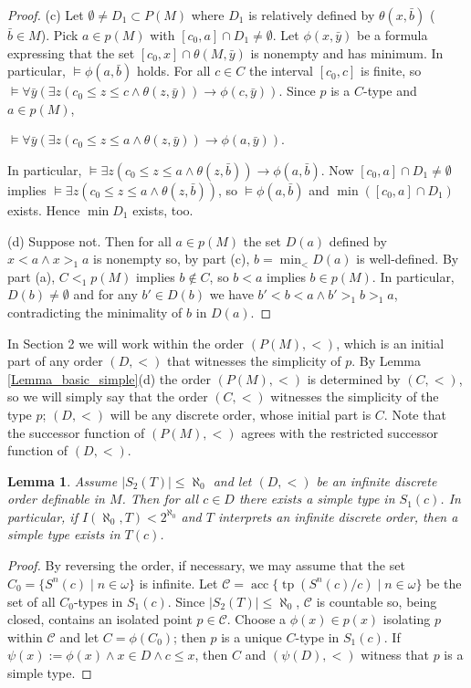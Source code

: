 \documentclass[12pt]{amsart}
\newtheorem{Lemma}[Theorem]{Lemma}
\theoremstyle{definition}
\DeclareMathOperator{\tp}{tp}
\DeclareMathOperator{\acc}{acc}
\begin{document}
\begin{proof}
\smallskip
(c) Let $\emptyset\neq D_1\subset P(M)$  where $D_1$ is relatively defined by $\theta(x,\bar b)$ ($\bar b\in M$). Pick $a\in p(M)$ with $[c_0,a]\cap D_1\neq\emptyset$.  Let $\phi(x,\bar y)$ be a formula expressing that the set
$[c_0,x]\cap\theta(M,\bar y)$ is nonempty and has minimum. 
In particular, $\models\phi(a,\bar b)$ holds. For all $c\in C$ the interval $[c_0,c]$ is finite, so $\models \forall \bar y \left(\exists z(c_0\leq z\leq c\land \theta(z,\bar y))\rightarrow \phi(c,\bar y)\right)$. Since $p$ is a $C$-type and $a\in p(M)$, 
\begin{center} 
$\models \forall \bar y \left(\exists z(c_0\leq z\leq a\land \theta(z,\bar y))\rightarrow \phi(a,\bar y)\right)$.  
\end{center}
In particular,   $\models  \exists z(c_0\leq z\leq a\land \theta(z,\bar b))\rightarrow \phi(a,\bar b)$.  Now  $[c_0,a]\cap D_1\neq \emptyset$ implies $\models  \exists z(c_0\leq z\leq a\land \theta(z,\bar b))$, so $\models\phi(a,\bar b)$ and $\min ([c_0,a]\cap D_1)$ exists. Hence $\min D_1$ exists, too.

\smallskip
(d) Suppose not. Then for all $a\in p(M)$ the set $D(a)$ defined by $x<a\land x>_1 a$ is nonempty so, by part (c), $b=\min_{<} D(a)$ is well-defined. By part (a), $C<_1p(M)$ implies $b\notin C$, so  $b<a$ implies $b\in p(M)$. In particular, $D(b)\neq\emptyset$ and for any $b'\in D(b)$ we have $b'<b<a\land b'>_1b>_1 a$, contradicting the minimality of $b$ in $D(a)$. 
\end{proof}

In Section 2 we will work  within the order $(P(M),<)$, which is an initial part of any  order $(D,<)$ that witnesses the simplicity of $p$. By Lemma \ref{Lemma_basic_simple}(d) the order $(P(M),<)$ is determined by   $(C,<)$, so we will simply say that the order $(C,<)$ witnesses the simplicity of the type $p$; $(D,<)$ will be any discrete order, whose initial part is $C$. Note that the  successor function  of $(P(M),<)$ agrees  with the restricted  successor function of $(D,<)$. 


\begin{Lemma}\label{Lemma_simpleExist}
Assume $|S_2(T)|\leq\aleph_0$ and  let $(D,<)$ be an infinite discrete order definable in $M$. Then for all $c\in D$ there exists a simple type in $S_1(c)$.
In particular, if $I(\aleph_0,T)<2^{\aleph_0}$ and $T$ interprets an infinite  discrete order, then a simple type exists in $T(c)$.
\end{Lemma}
\begin{proof}
By reversing the order, if necessary, we may assume that the set $C_0=\{S^n(c)\mid n\in \omega\}$ is infinite.  Let $\mathcal C=\acc \{\tp(S^n(c)/c)\mid n\in\omega \}$
be the set of all $C_0$-types in $S_1(c)$. Since $|S_2(T)|\leq\aleph_0$, $\mathcal C$ is  countable so, being closed, contains an  isolated point $p\in \mathcal C$. Choose a  
$\phi(x)\in p(x)$ isolating  $p$ within $\mathcal C$ and let $C=\phi(C_0)$; then $p$ is a unique $C$-type in $S_1(c)$.   If $\psi(x):=\phi(x)\land x\in D \land c\leq x$, then $C$ and $(\psi(D),<)$  witness that $p$ is a simple type.
\end{proof}
\end{document}
